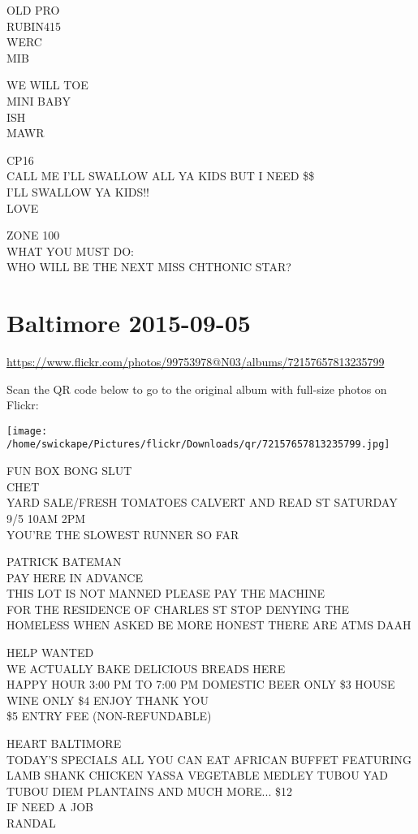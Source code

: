 \documentclass[10pt,letterpaper]{article}
\begin{document}
OLD PRO\\
RUBIN415\\
WERC\\
MIB

WE WILL TOE\\
MINI BABY\\
ISH\\
MAWR

CP16\\
CALL ME I'LL SWALLOW ALL YA KIDS BUT I NEED \$\$\\
I'LL SWALLOW YA KIDS!!\\
LOVE

ZONE 100\\
WHAT YOU MUST DO:\\
WHO WILL BE THE NEXT MISS CHTHONIC STAR?


\section*{Baltimore 2015-09-05}

\url{https://www.flickr.com/photos/99753978@N03/albums/72157657813235799}

Scan the QR code below to go to the original album with full-size photos on Flickr:

\texttt{[image: /home/swickape/Pictures/flickr/Downloads/qr/72157657813235799.jpg]}


FUN BOX BONG SLUT\\
CHET\\
YARD SALE/FRESH TOMATOES CALVERT AND READ ST SATURDAY 9/5 10AM 2PM\\
YOU'RE THE SLOWEST RUNNER SO FAR

PATRICK BATEMAN\\
PAY HERE IN ADVANCE\\
THIS LOT IS NOT MANNED PLEASE PAY THE MACHINE\\
FOR THE RESIDENCE OF CHARLES ST STOP DENYING THE HOMELESS WHEN ASKED BE MORE HONEST THERE ARE ATMS DAAH

HELP WANTED\\
WE ACTUALLY BAKE DELICIOUS BREADS HERE\\
HAPPY HOUR 3:00 PM TO 7:00 PM DOMESTIC BEER ONLY \$3 HOUSE WINE ONLY \$4 ENJOY THANK YOU\\
\$5 ENTRY FEE (NON{-}REFUNDABLE)

HEART BALTIMORE\\
TODAY'S SPECIALS ALL YOU CAN EAT AFRICAN BUFFET FEATURING LAMB SHANK CHICKEN YASSA VEGETABLE MEDLEY TUBOU YAD TUBOU DIEM PLANTAINS AND MUCH MORE... \$12\\
IF NEED A JOB\\
RANDAL
\end{document}
